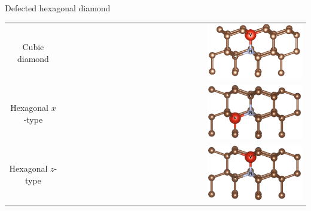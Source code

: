 \documentclass[notes=hide]{beamer}
\begin{document}
\begin{frame}{Defected hexagonal diamond}
  \begin{center}
    \begin{tabular}{cr}
      Cubic diamond   & \includegraphics[width=0.4\textwidth]{images/POSCAR_16_view.png}\\
      Hexagonal $ x $-type &\includegraphics[width=0.4\textwidth]{images/POSCAR_16_x_view.png}\\
      Hexagonal $ z $-type & \includegraphics[width=0.4\textwidth]{images/POSCAR_16_z_view.png}
    \end{tabular}
  \end{center}
\end{frame}



\end{document}
